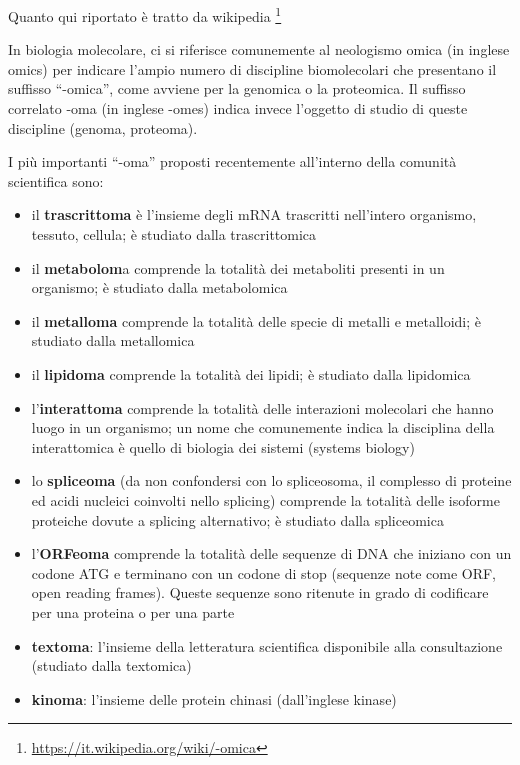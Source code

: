 \documentclass[a4paper,12pt, oneside]{book}
\begin{document}
\begin{shaded}
  Quanto qui riportato è tratto da wikipedia
  \footnote{\url{https://it.wikipedia.org/wiki/-omica}} 
  \begin{definizione}
    In biologia molecolare, ci si riferisce comunemente al neologismo omica (in
    inglese omics) per indicare l'ampio numero di discipline biomolecolari che
    presentano il suffisso ``-omica'', come avviene per la genomica o la
    proteomica. Il suffisso correlato -oma (in inglese -omes) indica invece
    l'oggetto di studio di queste discipline (genoma, proteoma).  
  \end{definizione}
  I più importanti ``-oma'' proposti recentemente all'interno della comunità
  scientifica sono:
  \begin{itemize}
    \item il \textbf{trascrittoma} è l'insieme degli mRNA trascritti nell'intero
    organismo, tessuto, cellula; è studiato dalla trascrittomica
    \item il \textbf{metabolom}a comprende la totalità dei metaboliti presenti
    in un organismo; è studiato dalla metabolomica 
    \item il \textbf{metalloma} comprende la totalità delle specie di metalli e
    metalloidi; è studiato dalla metallomica 
    \item il \textbf{lipidoma} comprende la totalità dei lipidi; è studiato dalla
    lipidomica 
    \item l'\textbf{interattoma} comprende la totalità delle interazioni
    molecolari che hanno luogo in un organismo; un nome che comunemente indica
    la disciplina 
    della interattomica è quello di biologia dei sistemi (systems biology)
    \item lo \textbf{spliceoma} (da non confondersi con lo spliceosoma, il
    complesso di 
    proteine ed acidi nucleici coinvolti nello splicing) comprende la totalità
    delle isoforme proteiche dovute a splicing alternativo; è studiato dalla
    spliceomica
    \item l'\textbf{ORFeoma} comprende la totalità delle sequenze di DNA che
    iniziano con 
    un codone ATG e terminano con un codone di stop (sequenze note come ORF,
    open reading frames). Queste sequenze sono ritenute in grado di codificare
    per una proteina o per una parte
    \item \textbf{textoma}: l'insieme della letteratura scientifica disponibile
    alla consultazione (studiato dalla textomica)
    \item \textbf{kinoma}: l'insieme delle protein chinasi (dall'inglese kinase)

\end{itemize}
\end{shaded}
\end{document}
